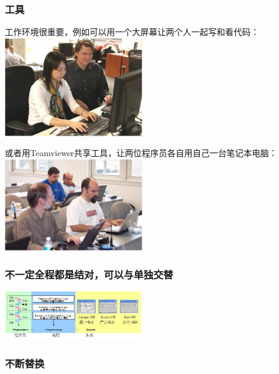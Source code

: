 \hypertarget{ux5de5ux5177}{%
\subsubsection{工具}\label{ux5de5ux5177}}

工作环境很重要，例如可以用一个大屏幕让两个人一起写和看代码：\\

\includegraphics[width=6cm]{leip381.jpg}

或者用Teamviewer共享工具，让两位程序员各自用自己一台笔记本电脑：\\

\includegraphics[width=6cm]{leip382.png}

\hypertarget{ux4e0dux4e00ux5b9aux5168ux7a0bux90fdux662fux7ed3ux5bf9ux53efux4ee5ux4e0eux5355ux72ecux4ea4ux66ff}{%
\subsubsection{不一定全程都是结对，可以与单独交替}\label{ux4e0dux4e00ux5b9aux5168ux7a0bux90fdux662fux7ed3ux5bf9ux53efux4ee5ux4e0eux5355ux72ecux4ea4ux66ff}}


\includegraphics[width=6cm]{leip51.jpg}

\hypertarget{ux4e0dux65adux66ffux6362}{%
\subsubsection{不断替换}\label{ux4e0dux65adux66ffux6362}}

